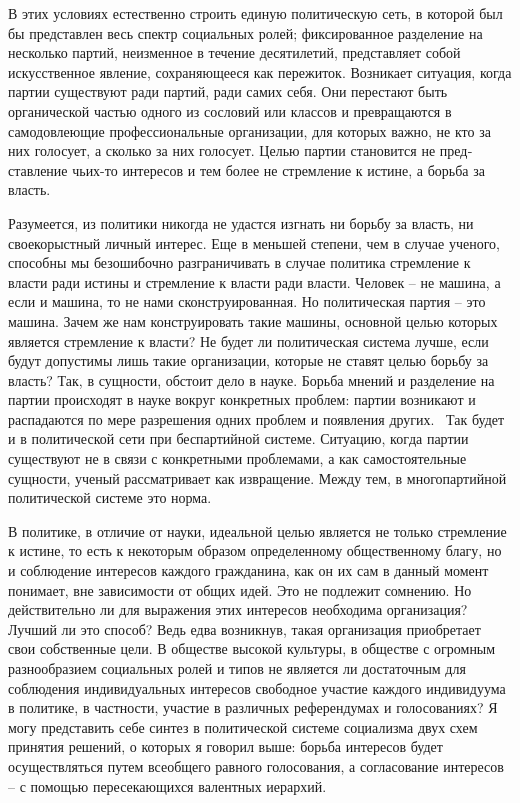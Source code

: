 \documentclass{book}
\begin{document}
В этих условиях естественно строить единую политическую сеть, в которой был бы представлен весь спектр социальных ролей; фиксированное разделение на несколько партий, неиз­менное в течение десятилетий, представляет собой искусствен­ное явление, сохраняющееся как пережиток. Возникает ситу­ация, когда партии существуют ради партий, ради самих себя. Они перестают быть органической частью одного из сословий или классов и превращаются в самодовлеющие профессиональ­ные организации, для которых важно, не кто  за них голосует, а сколько  за них голосует. Целью партии становится не пред­ставление чьих-то интересов и тем более не стремление к исти­не, а борьба за власть.

Разумеется, из политики никогда не удастся изгнать ни борь­бу за власть, ни своекорыстный личный интерес. Еще в мень­шей степени, чем в случае ученого, способны мы безошибочно разграничивать в случае политика стремление к власти ради истины и стремление к власти ради власти. Человек -- не маши­на, а если и машина, то не нами сконструированная. Но поли­тическая партия -- это машина. Зачем же нам конструировать такие машины, основной целью которых является стремление к власти? Не будет ли политическая система лучше, если будут допустимы лишь такие организации, которые не ставят целью борьбу за власть? Так, в сущности, обстоит дело в науке. Борь­ба мнений и разделение на партии происходят в науке вокруг конкретных проблем: партии возникают и распадаются по мере разрешения одних проблем и появления других.  Так будет и в политической сети при беспартийной системе. Ситуацию, ког­да партии существуют не в связи с конкретными проблемами, а как самостоятельные сущности, ученый рассматривает как извращение. Между тем,
 в многопартийной политической си­стеме это норма.

В политике, в отличие от науки, идеальной целью является не только стремление к истине, то есть к некоторым образом определенному общественному благу, но и соблюдение инте­ресов каждого гражданина, как он их сам в данный момент понимает, вне зависимости от общих идей. Это не подлежит сомнению. Но действительно ли для выражения этих интересов необходима организация? Лучший ли это способ? Ведь едва возникнув, такая организация приобретает свои собственные цели. В обществе высокой культуры, в обществе с огромным разнообразием социальных ролей и типов не является ли доста­точным для соблюдения индивидуальных интересов свободное участие каждого индивидуума в политике, в частности, участие в различных референдумах и голосованиях? Я могу предста­вить себе синтез в политической системе социализма двух схем принятия решений, о которых я говорил выше: борьба интере­сов будет осуществляться путем всеобщего равного голосова­ния, а согласование интересов -- с помощью пересекающихся валентных иерархий.
\end{document}
